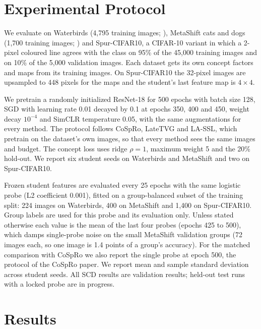 \documentclass{article}
\begin{document}
\section{Experimental Protocol}
We evaluate on Waterbirds (4,795 training images; \citealp{sagawa2020groupdro}), MetaShift cats and dogs (1,700 training images; \citealp{liang2022metashift}) and Spur-CIFAR10, a CIFAR-10 variant \citep{krizhevsky2009cifar} in which a 2-pixel coloured line agrees with the class on 95\% of the 45,000 training images and on 10\% of the 5,000 validation images. Each dataset gets its own concept factors and maps from its training images. On Spur-CIFAR10 the 32-pixel images are upsampled to 448 pixels for the maps and the student's last feature map is $4\times4$.

We pretrain a randomly initialized ResNet-18 for 500 epochs with batch size 128, SGD with learning rate 0.01 decayed by 0.1 at epochs 350, 400 and 450, weight decay $10^{-4}$ and SimCLR temperature 0.05, with the same augmentations for every method. The protocol follows CoSpRo, LateTVG and LA-SSL, which pretrain on the dataset's own images, so that every method sees the same images and budget. The concept loss uses ridge $\rho=1$, maximum weight 5 and the 20\% hold-out. We report six student seeds on Waterbirds and MetaShift and two on Spur-CIFAR10.

Frozen student features are evaluated every 25 epochs with the same logistic probe (L2 coefficient 0.001), fitted on a group-balanced subset of the training split: 224 images on Waterbirds, 400 on MetaShift and 1,400 on Spur-CIFAR10. Group labels are used for this probe and its evaluation only. Unless stated otherwise each value is the mean of the last four probes (epochs 425 to 500), which damps single-probe noise on the small MetaShift validation groups (72 images each, so one image is 1.4 points of a group's accuracy). For the matched comparison with CoSpRo we also report the single probe at epoch 500, the protocol of the CoSpRo paper. We report mean and sample standard deviation across student seeds. All SCD results are validation results; held-out test runs with a locked probe are in progress.

\section{Results}
\end{document}
